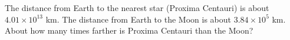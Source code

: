 \begin{challengeBox}
\prob The distance from Earth to the nearest star (Proxima Centauri) is about $4.01 \times 10^{13}$ km. The distance from Earth to the Moon is about $3.84 \times 10^5$ km. About how many times farther is Proxima Centauri than the Moon? \answerBlank[3cm]
\end{challengeBox}

